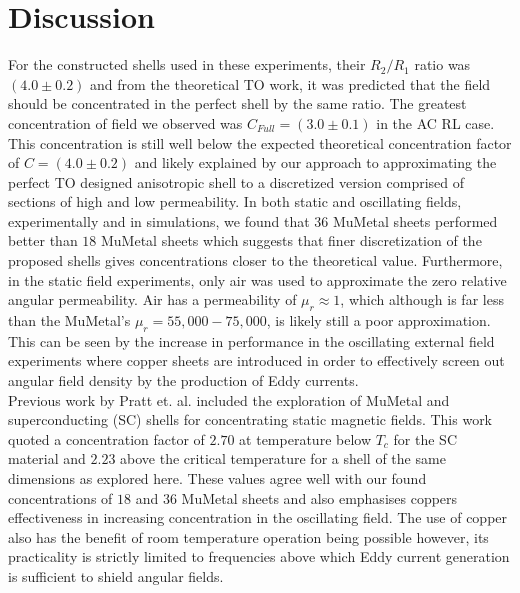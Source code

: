 \documentclass[11pt]{iopart}
\begin{document}

\section{Discussion}

For the constructed shells used in these experiments, their $R_2/R_1$
ratio was $(4.0\pm0.2)$ and from the theoretical TO work, it was
predicted that the field should be concentrated in the perfect shell
by the same ratio. The greatest concentration of field we observed was
$C_{Full} = (3.0\pm0.1)$ in the AC RL case. This concentration is
still well below the expected theoretical concentration factor of $C = (4.0
\pm 0.2)$ and likely explained by our approach to approximating the
perfect TO designed anisotropic shell to a discretized version
comprised of sections of high and low permeability.  In both static
and oscillating fields, experimentally and in simulations, we found
that $36$ MuMetal sheets performed better than $18$ MuMetal sheets
which suggests that finer discretization of the proposed shells gives
concentrations closer to the theoretical value. Furthermore, in the
static field experiments, only air was used to approximate the zero
relative angular permeability. Air has a permeability of $\mu_r
\approx 1$, which although is far less than the MuMetal's $\mu_r =
55,000-75,000 $, is likely still a poor approximation. This can be
seen by the increase in performance in the oscillating external field
experiments where copper sheets are introduced in order to effectively
screen out angular field density by the production of Eddy
currents. \\
Previous work by Pratt et. al.\cite{} included the exploration of
MuMetal and superconducting (SC) shells for concentrating static
magnetic fields. This work quoted a concentration factor of $2.70$ at
temperature below $T_c$ for the SC material and $2.23$ above the
critical temperature for a shell of the same dimensions as explored
here. These values agree well with our found concentrations of $18$
and $36$ MuMetal sheets and also emphasises coppers effectiveness in
increasing concentration in the oscillating field. The use of copper
also has the benefit of room temperature operation being possible
however, its practicality is strictly limited to frequencies above
which Eddy current generation is sufficient to shield angular fields. \\
\end{document}

